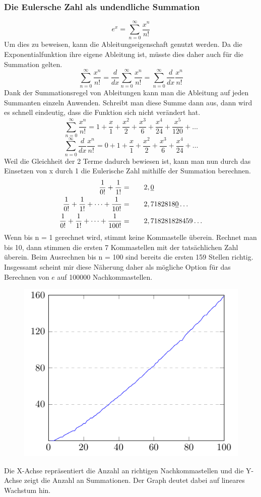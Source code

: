 \subsubsection{Die Eulersche Zahl als undendliche Summation}
\[e^x = \sum_{n=0}^\infty \frac{x^n}{n!}
  \]Um dies zu beweisen, kann die Ableitungseigenschaft genutzt werden. Da die Exponentialfunktion ihre eigene Ableitung ist, müsste dies daher auch für die Summation gelten.  \[
  \sum_{n=0}^\infty \frac{x^n}{n!} = \frac{d}{dx}\sum_{n=0}^\infty \frac{x^n}{n!} = \sum_{n=0}^\infty \frac{d}{dx}\frac{x^n}{n!} 
  \] Dank der Summationsregel von Ableitungen kann man die Ableitung auf jeden Summanten einzeln Anwenden. Schreibt man diese Summe dann aus, dann wird es schnell eindeutig, dass die Funktion sich nicht verändert hat. \[
  \sum_{n=0}^\infty \frac{x^n}{n!} = 1 + \frac{x}{1} + \frac{x^2}{2} + \frac{x^3}{6} + \frac{x^4}{24} + \frac{x^5}{120} + \dots
  \] \[
  \sum_{n=0}^\infty \frac{d}{dx}\frac{x^{n}}{n!} = 0 +  1 + \frac{x}{1} + \frac{x^2}{2} + \frac{x^3}{6} + \frac{x^4}{24} + \dots
\]Weil die Gleichheit der 2 Terme dadurch bewiesen ist, kann man nun durch das Einsetzen von x durch 1 die Eulerische Zahl mithilfe der Summation berechnen. \[
  \begin{aligned}
    \frac{1}{0!} + \frac{1}{1!} = \indent\crel{2},\underline{0}\\
    \frac{1}{0!} + \frac{1}{1!} + \dots + \frac{1}{10!} =  \indent\crel{2},7182818\underline{0}\dots\\
    \frac{1}{0!} + \frac{1}{1!} + \dots + \frac{1}{100!} = \indent\crel{2},718281828459\dots
  \end{aligned}
\] \newpage
Wenn bis n = 1 gerechnet wird, stimmt keine Kommastelle überein. Rechnet man bis 10, dann stimmen die ersten 7 Kommastellen mit der tatsächlichen Zahl überein. Beim Ausrechnen bis n = 100 sind bereits die ersten 159 Stellen richtig. Insgessamt scheint mir diese Näherung daher als mögliche Option für das Berechnen von $e$ auf 100000 Nachkommastellen.
\begin{figure}[h]
  \includegraphics{medien2/summation/summation.pdf}
  \centering
\end{figure}
\par Die X-Achse repräsentiert die Anzahl an richtigen Nachkommastellen und die Y-Achse zeigt die Anzahl an Summationen. Der Graph deutet dabei auf lineares Wachstum hin.
